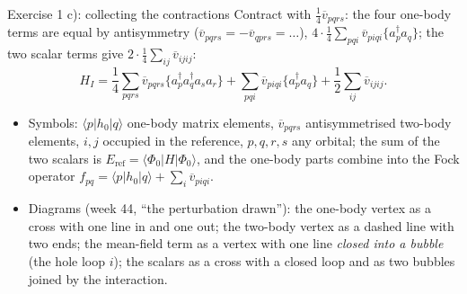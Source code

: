 \documentclass[aspectratio=169,10pt]{beamer}
\newcommand{\mel}[3]{\langle #1\lvert #2\rvert #3\rangle}
\newcommand{\cre}[1]{a_{#1}^{\dagger}}
\newcommand{\ann}[1]{a_{#1}}
\newcommand{\no}[1]{\bigl\{#1\bigr\}}
\newcommand{\vbar}[4]{\overline v_{#1#2#3#4}}
\newcommand{\Eref}{E_{\mathrm{ref}}}
\newcommand{\ph}{\Phi_0}
\begin{document}
\begin{frame}{Exercise 1 c): collecting the contractions}
\small
Contract with $\tfrac14\vbar{p}{q}{r}{s}$: the four one-body terms are equal by antisymmetry ($\vbar{p}{q}{r}{s}=-\vbar{q}{p}{r}{s}=\ldots$), $4\cdot\tfrac14\sum_{pqi}\vbar{p}{i}{q}{i}\no{\cre{p}\ann{q}}$; the two scalar terms give $2\cdot\tfrac14\sum_{ij}\vbar{i}{j}{i}{j}$:
\[
\boxed{H_I=\frac14\sum_{pqrs}\vbar{p}{q}{r}{s}\no{\cre{p}\cre{q}\ann{s}\ann{r}}+\sum_{pqi}\vbar{p}{i}{q}{i}\no{\cre{p}\ann{q}}+\frac12\sum_{ij}\vbar{i}{j}{i}{j}.}
\]
\begin{itemize}
\item Symbols: $\mel{p}{h_0}{q}$ one-body matrix elements, $\vbar{p}{q}{r}{s}$ antisymmetrised two-body elements, $i,j$ occupied in the reference, $p,q,r,s$ any orbital; the sum of the two scalars is $\Eref=\mel{\ph}{H}{\ph}$, and the one-body parts combine into the Fock operator $f_{pq}=\mel{p}{h_0}{q}+\sum_i\vbar{p}{i}{q}{i}$.
\item Diagrams (week 44, ``the perturbation drawn''): the one-body vertex as a cross with one line in and one out; the two-body vertex as a dashed line with two ends; the mean-field term as a vertex with one line \emph{closed into a bubble} (the hole loop $i$); the scalars as a cross with a closed loop and as two bubbles joined by the interaction.
\end{itemize}
\end{frame}
\end{document}
